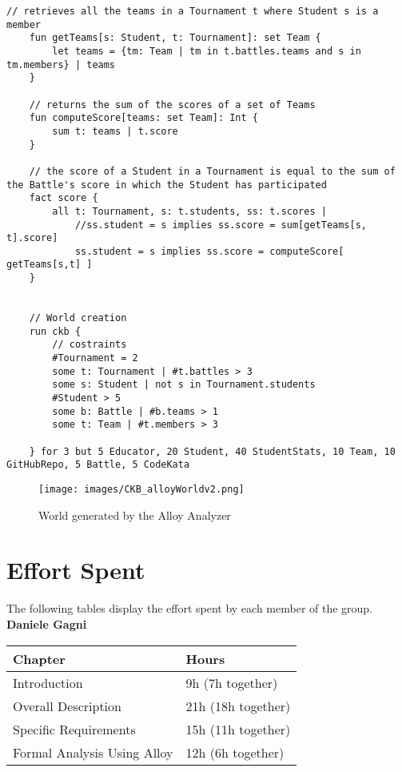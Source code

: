 \documentclass[a4paper, 11pt, titlepage]{article}
\begin{document}
\begin{lstlisting}[style=alloyStyle]
    // retrieves all the teams in a Tournament t where Student s is a member
    fun getTeams[s: Student, t: Tournament]: set Team {
        let teams = {tm: Team | tm in t.battles.teams and s in tm.members} | teams
    }

    // returns the sum of the scores of a set of Teams
    fun computeScore[teams: set Team]: Int { 
        sum t: teams | t.score
    }

    // the score of a Student in a Tournament is equal to the sum of the Battle's score in which the Student has participated
    fact score {
    	all t: Tournament, s: t.students, ss: t.scores | 
    		//ss.student = s implies ss.score = sum[getTeams[s, t].score]
    		ss.student = s implies ss.score = computeScore[ getTeams[s,t] ]
    }


    // World creation
    run ckb {
    	// costraints  
    	#Tournament = 2
    	some t: Tournament | #t.battles > 3
    	some s: Student | not s in Tournament.students
    	#Student > 5	
    	some b: Battle | #b.teams > 1
    	some t: Team | #t.members > 3	

    } for 3 but 5 Educator, 20 Student, 40 StudentStats, 10 Team, 10 GitHubRepo, 5 Battle, 5 CodeKata

\end{lstlisting}

\begin{figure}[H]
    \centering
    \texttt{[image: images/CKB\_alloyWorldv2.png]}
    \caption{World generated by the Alloy Analyzer}
    \label{fig:AlloyWorld}
\end{figure}

\section{Effort Spent}
The following tables display the effort spent by each member of the group.\\

\textbf{Daniele Gagni}

\begin{tabular}{|l|l|} 
    \hline
    \textbf{Chapter}            & \textbf{Hours}  \\ 
    \hline
    Introduction                & 9h (7h together)             \\ 
    \hline
    Overall Description         & 21h (18h together)          \\ 
    \hline
    Specific Requirements       & 15h  (11h together)              \\ 
    \hline
    Formal Analysis Using Alloy & 12h  (6h together)              \\
    \hline
\end{tabular}\\
\end{document}
